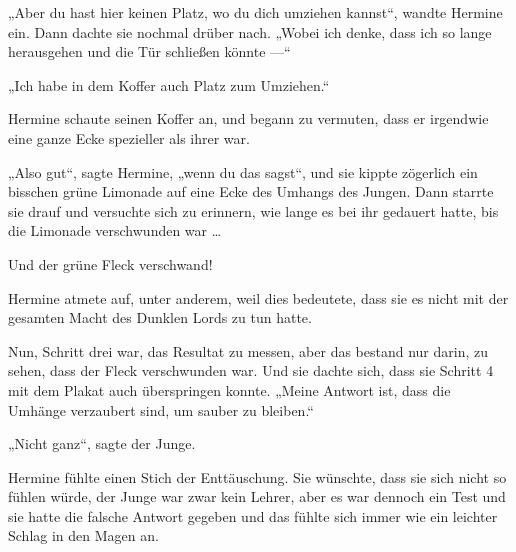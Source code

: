 „Aber du hast hier keinen Platz, wo du dich umziehen kannst“, wandte Hermine ein. Dann dachte sie nochmal drüber nach.
„Wobei ich denke, dass ich so lange herausgehen und die Tür schließen könnte —“

„Ich habe in dem Koffer auch Platz zum Umziehen.“

Hermine schaute seinen Koffer an, und begann zu vermuten, dass er irgendwie eine ganze Ecke spezieller als ihrer war.

„Also gut“, sagte Hermine, „wenn du das sagst“, und sie kippte zögerlich ein bisschen grüne Limonade auf eine Ecke des Umhangs des Jungen. Dann starrte sie drauf und versuchte sich zu erinnern, wie lange es bei ihr gedauert hatte, bis die Limonade verschwunden war …

Und der grüne Fleck verschwand!

Hermine atmete auf, unter anderem, weil dies bedeutete, dass sie es nicht mit der gesamten Macht des Dunklen Lords zu tun hatte.

Nun, Schritt drei war, das Resultat zu messen, aber das bestand nur darin, zu sehen, dass der Fleck verschwunden war. Und sie dachte sich, dass sie Schritt 4 mit dem Plakat auch überspringen konnte.
„Meine Antwort ist, dass die Umhänge verzaubert sind, um sauber zu bleiben.“

„Nicht ganz“, sagte der Junge.

Hermine fühlte einen Stich der Enttäuschung. Sie wünschte, dass sie sich nicht so fühlen würde, der Junge war zwar kein Lehrer, aber es war dennoch ein Test und sie hatte die falsche Antwort gegeben und das fühlte sich immer wie ein leichter Schlag in den Magen an.

